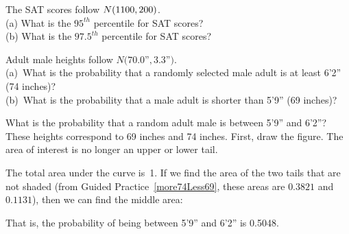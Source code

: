 \begin{exercisewrap}
\begin{nexercise}
The SAT scores follow $N(1100{}, 200{})$.\footnotemark{} \\
(a) What is the $95^{th}$ percentile for SAT scores? \\
(b) What is the $97.5^{th}$ percentile for SAT scores?
\end{nexercise}
\end{exercisewrap}

\D{\newpage}

\begin{exercisewrap}
\begin{nexercise}\label{more74Less69}
Adult male heights follow $N(70.0$''$, 3.3$''$)$.\footnotemark{} \\
(a)~What is the probability that a randomly selected male
    adult is at least 6'2'' (74 inches)? \\
(b)~What is the probability that a male adult is shorter
    than 5'9'' (69 inches)?
\end{nexercise}
\end{exercisewrap}

\begin{examplewrap}
\begin{nexample}{What is the probability that a random adult
    male is between 5'9'' and 6'2''?}
  These heights correspond to 69 inches and 74 inches.
  First, draw the figure.
  The area of interest is no longer an upper or lower
  tail.\vspace{-2mm}
  \begin{center}
  \vspace{-2mm}
  \end{center}
  The total area under the curve is~1.
  If we find the area of the two tails that are not shaded
  (from Guided Practice~\ref{more74Less69}, these areas are
  $0.3821$ and $0.1131$), then we can find the middle
  area:\vspace{-2mm}
  \begin{center}
  \vspace{-2mm}
  \end{center}
  That is, the probability of being between 5'9'' and 6'2''
  is 0.5048.
\end{nexample}
\end{examplewrap}

